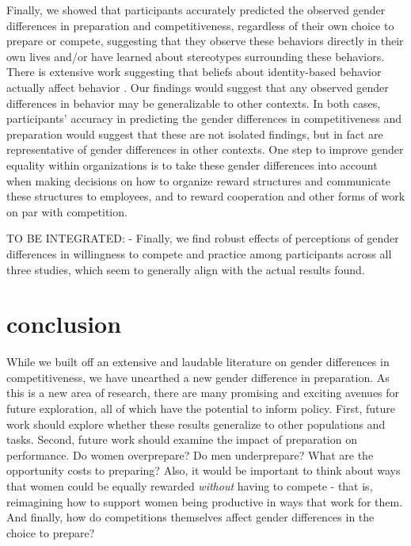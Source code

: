 \documentclass[a4paper, nobind]{templates/ociamthesis}
\begin{document}
Finally, we showed that participants accurately predicted the observed gender differences in preparation and competitiveness, regardless of their own choice to prepare or compete, suggesting that they observe these behaviors directly in their own lives and/or have learned about stereotypes surrounding these behaviors. There is extensive work suggesting that beliefs about identity-based behavior actually affect behavior \autocite{Babcock2012,Bowles2007,Toosi2019,Smith2014,Benjamin2010c,Bertrand2015,Akerlof2000}. Our findings would suggest that any observed gender differences in behavior may be generalizable to other contexts. In both cases, participants' accuracy in predicting the gender differences in competitiveness and preparation would suggest that these are not isolated findings, but in fact are representative of gender differences in other contexts. One step to improve gender equality within organizations is to take these gender differences into account when making decisions on how to organize reward structures and communicate these structures to employees, and to reward cooperation and other forms of work on par with competition.

TO BE INTEGRATED:
- Finally, we find robust effects of perceptions of gender differences in willingness to compete and practice among participants across all three studies, which seem to generally align with the actual results found.

\hypertarget{conclusion}{%
\section{conclusion}\label{conclusion}}

While we built off an extensive and laudable literature on gender differences in competitiveness, we have unearthed a new gender difference in preparation. As this is a new area of research, there are many promising and exciting avenues for future exploration, all of which have the potential to inform policy. First, future work should explore whether these results generalize to other populations and tasks. Second, future work should examine the impact of preparation on performance. Do women overprepare? Do men underprepare? What are the opportunity costs to preparing? Also, it would be important to think about ways that women could be equally rewarded \emph{without} having to compete - that is, reimagining how to support women being productive in ways that work for them. And finally, how do competitions themselves affect gender differences in the choice to prepare?
\end{document}
